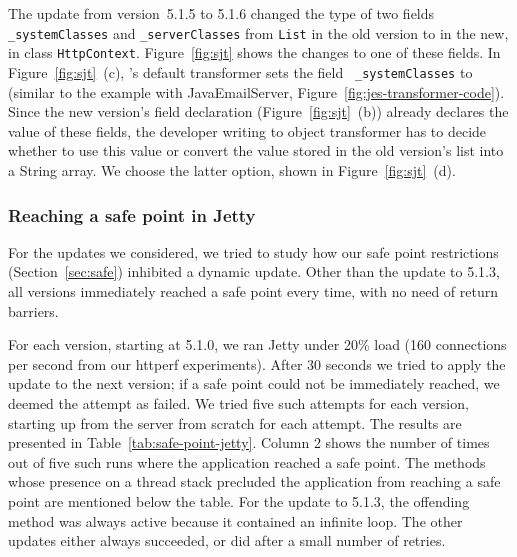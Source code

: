 The update from version~5.1.5 to 5.1.6 changed the type of two fields {\tt
\_systemClasses} and {\tt \_serverClasses} from {\tt List} in the old
version to \StringArray in the new, in class {\tt HttpContext}.
Figure~\ref{fig:sjt} shows the changes to one of these fields. In
Figure~\ref{fig:sjt}~(c), \UPT's default transformer sets the field {\tt
\_systemClasses} to \NULL (similar to the example with JavaEmailServer,
Figure~\ref{fig:jes-transformer-code}). Since the new version's field
declaration (Figure~\ref{fig:sjt}~(b)) already declares the value of these
fields, the developer writing to object transformer has to decide whether
to use this value or convert the value stored in the old version's list
into a String array. We choose the latter option, shown in
Figure~\ref{fig:sjt}~(d).

\subsubsection{Reaching a safe point in Jetty}



For the updates we considered, we tried to study how our safe point
restrictions (Section~\ref{sec:safe}) inhibited a dynamic update.
Other than the update to 5.1.3, all versions immediately
reached a safe point every time, with no need of return barriers.



For each version, starting at 5.1.0, we ran Jetty under 20\% load (160
connections per second from our httperf experiments). After 30 seconds we
tried to apply the update to the next version; if a safe point could not be
immediately reached, we deemed the attempt as failed. We tried five such
attempts for each version, starting up from the server from scratch for
each attempt. The results are presented in
Table~\ref{tab:safe-point-jetty}. Column 2 shows the number of times out of
five such runs where the application reached a safe point. The methods
whose presence on a thread stack precluded the application from reaching a
safe point are mentioned below the table. For the update to 5.1.3, the
offending method was always active because it contained an infinite loop.
The other updates either always succeeded, or did after a small number of
retries.

